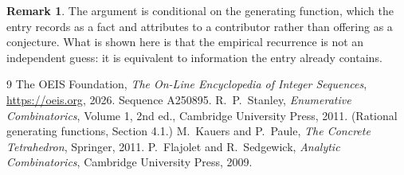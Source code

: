 \documentclass[11pt,a4paper]{article}
\theoremstyle{plain}
\theoremstyle{definition}
\newtheorem{remark}[theorem]{Remark}
\begin{document}
\begin{remark}
The argument is conditional on the generating function, which the entry records as a fact and
attributes to a contributor rather than offering as a conjecture. What is shown here is that
the empirical recurrence is not an independent guess: it is equivalent to information the
entry already contains.
\end{remark}

\begin{thebibliography}{9}
 The OEIS Foundation, \emph{The On-Line Encyclopedia of Integer
Sequences}, \url{https://oeis.org}, 2026. Sequence A250895.
 R.~P.~Stanley, \emph{Enumerative Combinatorics}, Volume 1, 2nd ed.,
Cambridge University Press, 2011. (Rational generating functions, Section 4.1.)
 M.~Kauers and P.~Paule, \emph{The Concrete Tetrahedron}, Springer, 2011.
 P.~Flajolet and R.~Sedgewick, \emph{Analytic Combinatorics}, Cambridge
University Press, 2009.
\end{thebibliography}
\end{document}
